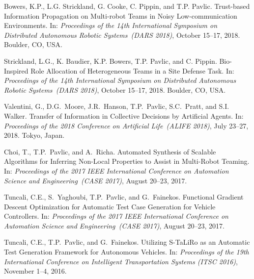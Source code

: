 \documentclass[10pt]{article}           %
\begin{document}
\begin{bibenum}
    \item Bowers, K.P., L.G. Strickland, G. Cooke, C. Pippin, and T.P.
        Pavlic. Trust-based Information Propagation on Multi-robot Teams
        in Noisy Low-communication Environments. In: \emph{Proceedings of the
        14th International Symposium on Distributed Autonomous Robotic
        Systems~(DARS 2018)}, October 15--17, 2018. Boulder, CO, USA.

    \item Strickland, L.G., K. Baudier, K.P. Bowers, T.P. Pavlic, and C.
        Pippin. Bio-Inspired Role Allocation of Heterogeneous Teams in a
        Site Defense Task. In: \emph{Proceedings of the 14th
            International Symposium on Distributed Autonomous Robotic
        Systems~(DARS 2018)}, October 15--17, 2018. Boulder, CO, USA.

    \item Valentini, G., D.G.~Moore, J.R.~Hanson, T.P.~Pavlic,
        S.C.~Pratt, and S.I. Walker. Transfer of Information in
        Collective Decisions by Artificial Agents. In: \emph{Proceedings
        of the 2018 Conference on Artificial Life~(ALIFE 2018)}, July
        23--27, 2018. Tokyo, Japan.

    \item Choi, T., T.P.~Pavlic, and A.~Richa. Automated
        Synthesis of Scalable Algorithms for Inferring Non-Local
        Properties to Assist in Multi-Robot Teaming. In:
        \emph{Proceedings of the 2017 IEEE International Conference on
        Automation Science and Engineering~(CASE 2017)},
        August 20--23, 2017. %

    \item Tuncali, C.E., S.~Yaghoubi, T.P.~Pavlic, and G.~Fainekos.
        Functional Gradient Descent Optimization for Automatic Test Case
        Generation for Vehicle Controllers. In:
        \emph{Proceedings of the 2017 IEEE International Conference on
        Automation Science and Engineering~(CASE 2017)},
        August 20--23, 2017. %

    \item Tuncali, C.E., T.P.~Pavlic, and G.~Fainekos. Utilizing
        S-TaLiRo as an Automatic Test Generation Framework for
        Autonomous Vehicles. In: \emph{Proceedings of the 19th
        International Conference on Intelligent Transportation
        Systems (ITSC 2016)}, November 1--4, 2016.\\


\end{bibenum}
\end{document}
